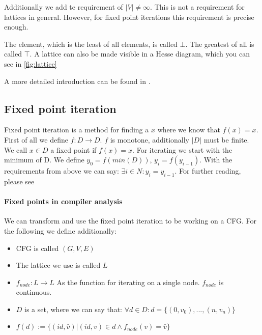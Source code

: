 Additionally we add te requirement of $|V| \not= \infty$. This is not a requirement for lattices in general. However, for fixed point iterations this requirement is precise enough.

The element, which is the least of all elements, is called $\bot$. The greatest of all is called $\top$. A lattice can also be made visible in a Hesse diagram, which you can see in \autoref{fig:lattice}

A more detailed introduction can be found in \cite{lattice_theory}.

\subsection{Fixed point iteration}
Fixed point iteration is a method for finding a $x$ where we know that $f(x)=x$. \newline
First of all we define $f: D \rightarrow D$. $f$ is monotone, additionally $|D|$ must be finite. We call $x \in D$ a fixed point if $f(x)=x$.
For iterating we start with the minimum of D. We define $y_0=f(min(D))$, $y_i=f(y_{i-1})$. With the requirements from above we can say: $\exists i \in N : y_i = y_{i-1}$. For further reading, please see \cite{fixed-point-iteration-basic}


\paragraph{Fixed points in compiler analysis}
We can transform and use the fixed point iteration to be working on a CFG. For the following we define additionally:
\begin{itemize}
	\item CFG is called $(G,V,E)$
	\item The lattice we use is called $L$
	\item $f _{node}:L \rightarrow L$ As the function for iterating on a single node. $f _{node}$ is continuous.
	\item $D$ is a set, where we can say that: $\forall d \in D: d = \{(0, v_0), ... , (n, v_n)\}$
	\item $f(d) := \{(id, \hat{v})| (id, v) \in d \wedge f _{node}(v) = \hat{v}\}$
\end{itemize}


